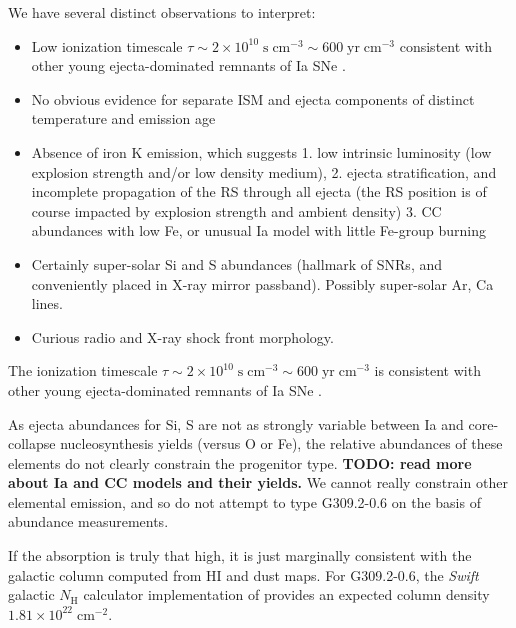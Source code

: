 \documentclass[preprint2,tighten,trackchanges]{aastex6}
\newcommand*{\mt}{\mathrm}
\newcommand*{\unit}[1]{\;\mt{#1}}  %
\newcommand*{\abt}{\mathord{\sim}} %
\newcommand*{\nH}{N_{\mathrm{H}}}
\newcommand*{\nHUnits}{\times 10^{22} \unit{cm^{-2}}}
\newcommand*{\TauUnits}{\unit{s\;cm^{-3}}}
\newcommand*{\AV}{A_{\mathrm{V}}}
\begin{document}
We have several distinct observations to interpret:
\begin{itemize}
    \item Low ionization timescale
        $\tau \sim 2 \times 10^{10} \TauUnits \sim 600 \unit{yr\;cm^{-3}}$
        consistent with other young ejecta-dominated remnants of Ia SNe
        \citep[][Table 4]{badenes2007}.
    \item No obvious evidence for separate ISM and ejecta components of
        distinct temperature and emission age
    \item Absence of iron K emission, which
        suggests
        1. low intrinsic luminosity (low explosion strength and/or low density
           medium),
        2. ejecta stratification, and incomplete propagation of the RS through
           all ejecta (the RS position is of course impacted by explosion strength
           and ambient density)
        3. CC abundances with low Fe, or unusual Ia model with little Fe-group
           burning
   \item Certainly super-solar Si and S abundances (hallmark of SNRs, and
       conveniently placed in X-ray mirror passband).
       Possibly super-solar Ar, Ca lines.
    \item Curious radio and X-ray shock front morphology.
\end{itemize}

The ionization timescale
$\tau \sim 2 \times 10^{10} \TauUnits \sim 600 \unit{yr\;cm^{-3}}$
is consistent with other young ejecta-dominated remnants of Ia SNe
\citep[][Table 4]{badenes2007}.

As ejecta abundances for Si, S are not as strongly variable between Ia and
core-collapse nucleosynthesis yields (versus O or Fe), the relative abundances
of these elements do not clearly constrain the progenitor type.
\textbf{TODO: read more about Ia and CC models and their yields.}
We cannot really constrain other elemental emission, and so do not attempt to
type G309.2-0.6 on the basis of abundance measurements.


If the absorption is truly that high, it is just marginally consistent with
the galactic column computed from HI and dust maps.
For G309.2-0.6, the \textit{Swift} galactic $\nH$ calculator implementation of
\citet{willingale2013} provides an expected column density $1.81 \nHUnits$.
\end{document}
